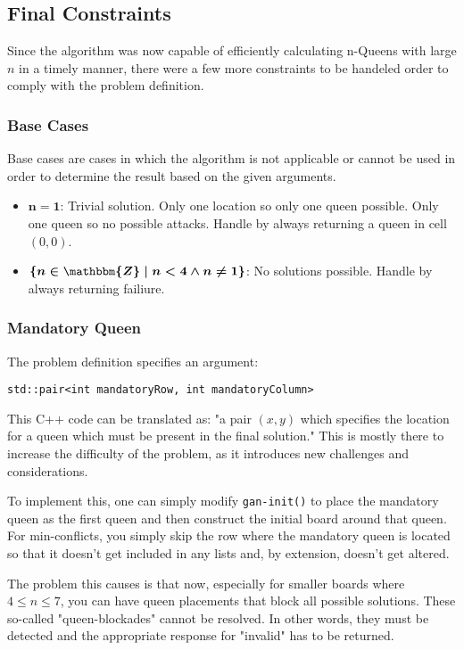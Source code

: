 \documentclass{article}
\begin{document}
\subsection{Final Constraints}
Since the algorithm was now capable of efficiently calculating n-Queens with large $n$ in a timely manner,
there were a few more constraints to be handeled order to comply with the problem definition.

\subsubsection{Base Cases}
Base cases are cases in which the algorithm is not applicable or cannot be used in order to determine the result based on the given arguments.

\begin{itemize}
    \item $\boldsymbol{n = 1}$: Trivial solution. Only one location so only one queen possible. Only one queen so no possible attacks.
          Handle by always returning a queen in cell $(0, 0)$.
    \item $\boldsymbol{\{ n \in \mathbbm{Z} \mid n < 4 \land n \neq 1\}}$: No solutions possible. Handle by always returning failiure.
\end{itemize}

\clearpage
\subsubsection{Mandatory Queen}
The problem definition specifies an argument:

\begin{lstlisting}
std::pair<int mandatoryRow, int mandatoryColumn>
\end{lstlisting}

This C++ code can be translated as: "a pair $(x, y)$ which specifies the location for a queen which must be present in the final solution."
This is mostly there to increase the difficulty of the problem, as it introduces new challenges and considerations.

To implement this, one can simply modify \texttt{gan-init()} to place the mandatory queen as the first queen and then construct the initial board around that queen.
For min-conflicts, you simply skip the row where the mandatory queen is located so that it doesn't get included in any lists and, by extension, doesn't get altered.

The problem this causes is that now, especially for smaller boards where \(4 \leq n \leq 7\),
you can have queen placements that block all possible solutions. These so-called "queen-blockades" cannot be resolved.
In other words, they must be detected and the appropriate response for "invalid" has to be returned.
\end{document}
